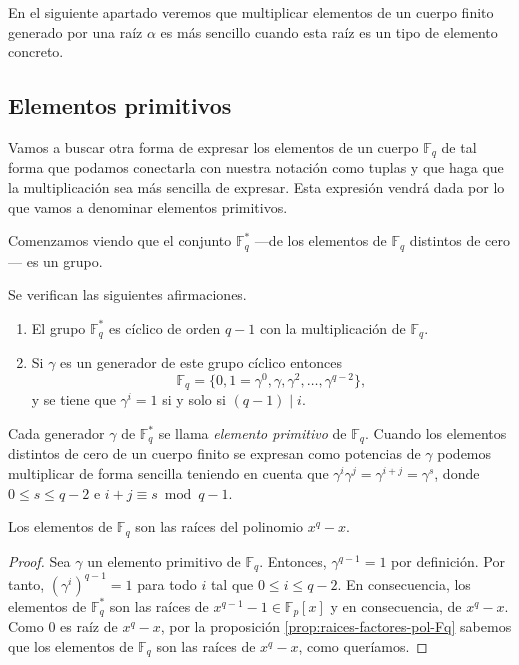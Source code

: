 En el siguiente apartado veremos que multiplicar elementos de un cuerpo finito generado por una raíz \(\alpha\) es más sencillo cuando esta raíz es un tipo de elemento concreto.

\subsection{Elementos primitivos}

Vamos a buscar otra forma de expresar los elementos de un cuerpo \(\mathbb F_q\) de tal forma que podamos conectarla con nuestra notación como tuplas y que haga que la multiplicación sea más sencilla de expresar.
Esta expresión vendrá dada por lo que vamos a denominar elementos primitivos.

Comenzamos viendo que el conjunto \(\mathbb F_q^*\) —de los elementos de \(\mathbb F_q\) distintos de cero— es un grupo.

\begin{theorem}
  \label{th:Fq-ast-cilcico}
  Se verifican las siguientes afirmaciones.
  \begin{enumerate}
    \item El grupo \(\mathbb F_q^*\) es cíclico de orden \(q - 1\) con la multiplicación de \(\mathbb F_q\).
    \item Si \(\gamma\) es un generador de este grupo cíclico entonces
    \[
      \mathbb F_q = \{0, 1 = \gamma^0, \gamma, \gamma^2, \dots, \gamma^{q-2}\},
    \] y se tiene que \(\gamma^i = 1\) si y solo si \((q-1) \mid i\).
  \end{enumerate}
\end{theorem}

Cada generador \(\gamma\) de \(\mathbb F_q^*\) se llama \textit{elemento primitivo} de \(\mathbb F_q\).
Cuando los elementos distintos de cero de un cuerpo finito se expresan como potencias de \(\gamma\) podemos multiplicar de forma sencilla teniendo en cuenta que \(\gamma^i\gamma^j = \gamma^{i+j} = \gamma^s\), donde \(0 \leq s \leq q-2\) e \(i + j \equiv s \bmod q - 1\).

\begin{theorem}
  \label{th:el-Fq-raices-pol}
  Los elementos de \(\mathbb F_q\) son las raíces del polinomio \(x^q - x\).
\end{theorem}

\begin{proof}
  Sea \(\gamma\) un elemento primitivo de \(\mathbb F_q\).
  Entonces, \(\gamma^{q-1} = 1\) por definición.
  Por tanto, \((\gamma^i)^{q-1} = 1\) para todo \(i\) tal que \(0 \leq i \leq q - 2\).
  En consecuencia, los elementos de \(\mathbb F_q^*\) son las raíces de \(x^{q-1}-1 \in \mathbb F_p[x]\) y en consecuencia, de \(x^q - x\).
  Como \(0\) es raíz de \(x^q - x\), por la proposición \ref{prop:raices-factores-pol-Fq} sabemos que los elementos de \(\mathbb F_q\) son las raíces de \(x^q - x\), como queríamos.
\end{proof}

